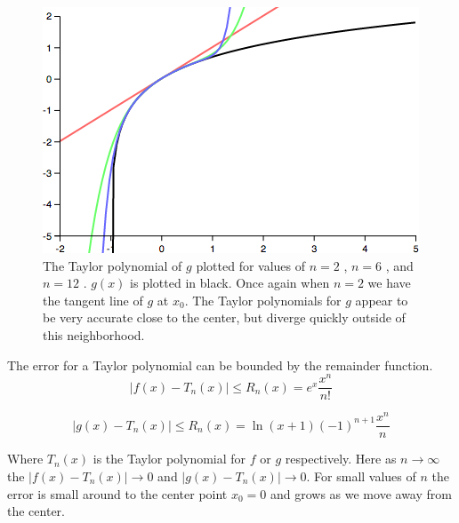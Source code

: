 {\begin{figure}[H]
\centering
\includegraphics[scale=0.65]{taylor-series-g.png}
\caption{The Taylor polynomial of $g$ plotted for values of $n = 2$ , $n = 6$ , and $n = 12$ . $g(x)$ is plotted in black. Once again when $n = 2$ we have the tangent line of $g$ at $x_0$. The Taylor polynomials for $g$ appear to be very accurate close to the center, but diverge quickly outside of this neighborhood.}
\end{figure}

The error for a Taylor polynomial can be bounded by the remainder function.
\[
|f(x) - T_n(x)| \le R_n(x) = e^x \frac{x^{n}}{n!}
\]

\[
|g(x) - T_n(x)| \le R_n(x) = \ln(x+1) (-1)^{n+1} \frac{x^{n}}{n}
\]

Where $T_n(x)$ is the Taylor polynomial for $f$ or $g$ respectively. Here as $n \to \infty$ the $|f(x) - T_n(x)| \to 0$ and $|g(x) - T_n(x)| \to 0$. For small values of $n$ the error is small around to the center point $x_0 = 0$ and grows as we move away from the center.

}
